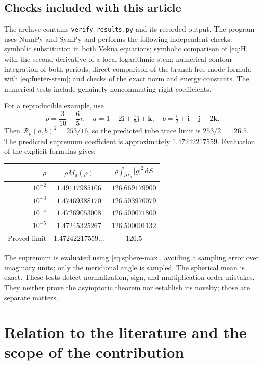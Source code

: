 \documentclass[11pt,a4paper]{article}
\numberwithin{equation}{section}
\theoremstyle{definition}
\theoremstyle{remark}
\newcommand{\dd}{\,\mathrm d}
\newcommand{\ii}{\mathbf i}
\newcommand{\jj}{\mathbf j}
\newcommand{\kk}{\mathbf k}
\begin{document}
\subsection{Checks included with this article}
The archive contains \texttt{verify\_results.py} and its recorded output.
The program uses NumPy and SymPy and performs the following independent
checks: symbolic substitution in both Vekua equations; symbolic
comparison of \eqref{eq:H} with the second derivative of a local
logarithmic stem; numerical contour integration of both periods; direct
comparison of the branch-free mode formula with
\eqref{eq:fueter-stem}; and checks of the exact norm and energy constants.
The numerical tests include genuinely noncommuting right coefficients.

For a reproducible example, use
\[
 p=\frac3{10}+\frac65\iota,\quad
 a=1-2\ii+\tfrac12\jj+\kk,\quad
 b=\tfrac12+\ii-\jj+2\kk.
\]
Then $\mathcal R_p(a,b)^2=253/16$, so the predicted tube trace limit is
$253/2=126.5$. The predicted supremum coefficient is approximately
$1.47242217559$. Evaluation of the explicit formulas gives:
\begin{center}
\renewcommand{\arraystretch}{1.18}
\begin{tabular}{@{}rcc@{}}
\toprule
$\rho$ & $\rho M_g(\rho)$ &
$\displaystyle\rho\int_{\partial T_\rho}|g|^2\dd S$\\
\midrule
$10^{-2}$ & $1.49117985106$ & $126.669179900$\\
$10^{-3}$ & $1.47469388170$ & $126.503970079$\\
$10^{-4}$ & $1.47269053008$ & $126.500071800$\\
$10^{-5}$ & $1.47245325267$ & $126.500001132$\\
\midrule
Proved limit & $1.47242217559\ldots$ & $126.5$\\
\bottomrule
\end{tabular}
\end{center}
The supremum is evaluated using \eqref{eq:sphere-max}, avoiding a
sampling error over imaginary units; only the meridional angle is
sampled. The spherical mean is exact. These tests detect normalization,
sign, and multiplication-order mistakes. They neither prove the
asymptotic theorem nor establish its novelty; those are separate matters.

\section{Relation to the literature and the scope of the contribution}
\label{sec:position}
\end{document}
